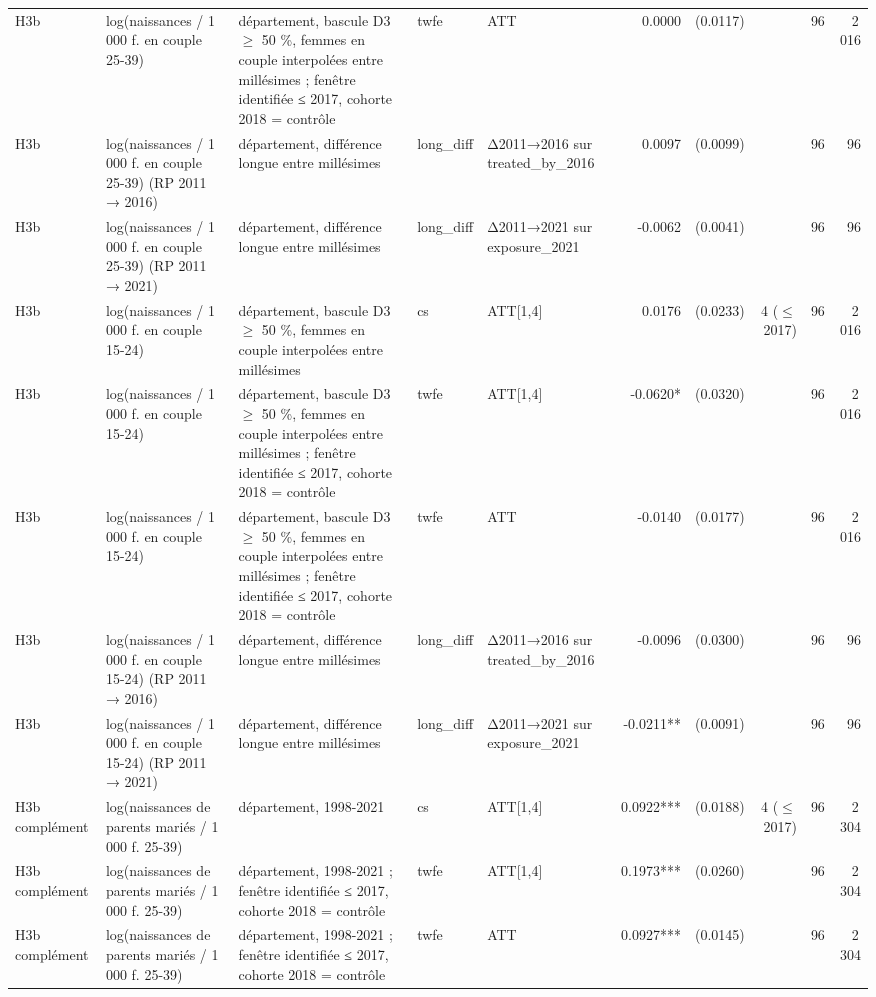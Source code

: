 \begin{table}
\begin{threeparttable}
\begin{tabular}{lp{3.8cm}p{5.5cm}lp{3.5cm}rrrrr}
H3b & log(naissances / 1 000 f. en couple 25-39) & département, bascule D3 $\geq$ 50 \%, femmes en couple interpolées entre millésimes ; fenêtre identifiée ≤ 2017, cohorte 2018 = contrôle & twfe & ATT & 0.0000 & (0.0117) &  & 96 & 2\,016 \\
H3b & log(naissances / 1 000 f. en couple 25-39) (RP 2011 → 2016) & département, différence longue entre millésimes & long\_diff & Δ2011→2016 sur treated\_by\_2016 & 0.0097 & (0.0099) &  & 96 & 96 \\
H3b & log(naissances / 1 000 f. en couple 25-39) (RP 2011 → 2021) & département, différence longue entre millésimes & long\_diff & Δ2011→2021 sur exposure\_2021 & -0.0062 & (0.0041) &  & 96 & 96 \\
H3b & log(naissances / 1 000 f. en couple 15-24) & département, bascule D3 $\geq$ 50 \%, femmes en couple interpolées entre millésimes & cs & ATT[1,4] & 0.0176 & (0.0233) & 4 ($\leq$ 2017) & 96 & 2\,016 \\
H3b & log(naissances / 1 000 f. en couple 15-24) & département, bascule D3 $\geq$ 50 \%, femmes en couple interpolées entre millésimes ; fenêtre identifiée ≤ 2017, cohorte 2018 = contrôle & twfe & ATT[1,4] & -0.0620* & (0.0320) &  & 96 & 2\,016 \\
H3b & log(naissances / 1 000 f. en couple 15-24) & département, bascule D3 $\geq$ 50 \%, femmes en couple interpolées entre millésimes ; fenêtre identifiée ≤ 2017, cohorte 2018 = contrôle & twfe & ATT & -0.0140 & (0.0177) &  & 96 & 2\,016 \\
H3b & log(naissances / 1 000 f. en couple 15-24) (RP 2011 → 2016) & département, différence longue entre millésimes & long\_diff & Δ2011→2016 sur treated\_by\_2016 & -0.0096 & (0.0300) &  & 96 & 96 \\
H3b & log(naissances / 1 000 f. en couple 15-24) (RP 2011 → 2021) & département, différence longue entre millésimes & long\_diff & Δ2011→2021 sur exposure\_2021 & -0.0211** & (0.0091) &  & 96 & 96 \\
H3b complément & log(naissances de parents mariés / 1 000 f. 25-39) & département, 1998-2021 & cs & ATT[1,4] & 0.0922*** & (0.0188) & 4 ($\leq$ 2017) & 96 & 2\,304 \\
H3b complément & log(naissances de parents mariés / 1 000 f. 25-39) & département, 1998-2021 ; fenêtre identifiée ≤ 2017, cohorte 2018 = contrôle & twfe & ATT[1,4] & 0.1973*** & (0.0260) &  & 96 & 2\,304 \\
H3b complément & log(naissances de parents mariés / 1 000 f. 25-39) & département, 1998-2021 ; fenêtre identifiée ≤ 2017, cohorte 2018 = contrôle & twfe & ATT & 0.0927*** & (0.0145) &  & 96 & 2\,304 \\

\end{tabular}
\end{threeparttable}
\end{table}
